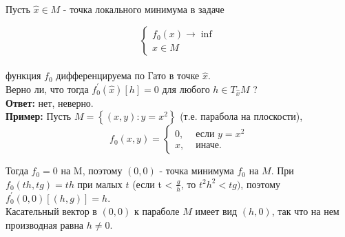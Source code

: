 \begin{task}

    Пусть $\hat{x} \in M$ - точка локального минимума в задаче
    
    $$
    \left\{\begin{array}{l}
    f_{0}(x) \rightarrow \inf \\
    x \in M
    \end{array}\right.
    $$\\
    функция $f_{0}$ дифференцируема по Гато в точке $\hat{x}$. \\
    Верно ли, что тогда $f_{0}^{\prime}(\hat{x})[h]=0$ для любого $h \in T_{\hat{x}} M$ ?\\
    \textbf{Ответ:} нет, неверно.\\
    \textbf{Пример:}
    Пусть $M=\left\{(x, y): y=x^{2}\right\}$ (т.е. парабола на плоскости),
    $$
    f_{0}(x, y)= \begin{cases}0, & \text { если } y=x^{2} \\ x, & \text { иначе. }\end{cases}
    $$
    
    Тогда $f_0 = 0$ на M, поэтому $(0,0)$ - точка минимума $f_{0}$ на $M$. При $f_{0}(t h, t g)=t h$ при малых $t$ (если t < $\frac{g}{h}$, то $t^2h^2 < tg)$, поэтому $f_{0}^{\prime}(0,0)[(h, g)]=h$.\\ 
    Касательный вектор в $(0,0)$ к параболе $M$ имеет вид $(h, 0)$, так что на нем производная равна $h \neq 0$. 
    \end{task}